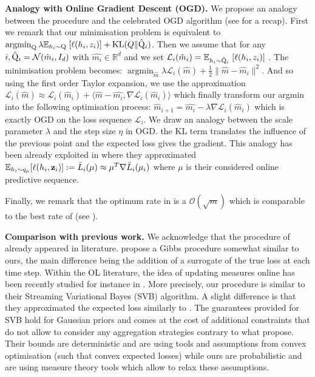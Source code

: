 \textbf{Analogy with Online Gradient Descent (OGD).} We propose an analogy between the procedure  and the celebrated OGD algorithm (see  for a recap). First we remark that our minimisation problem is equivalent to
$\operatorname{argmin}_{\mathrm{Q}} \lambda\mathbb{E}_{h_i\sim \mathrm{Q}} \; [\ell(h_i,z_i)] + \operatorname{KL}(Q\| \hat{\mathrm{Q}}_{i})$.
Then we assume that for any $i, \hat{\mathrm{Q}}_i=\mathcal{N}(\hat{m}_i,I_d)$ with $\hat{m_i}\in\mathbb{R}^d$  and we set $\mathcal{L}_i(\hat{m}_i)= \mathbb{E}_{h_i\sim \hat{\mathrm{Q}}_i} \; [\ell(h_i,z_i)] $ .
The minimisation problem becomes: $\operatorname{argmin}_{\hat{m}} \lambda\mathcal{L}_i(\hat{m}) + \frac{1}{2} \| \hat{m} - \hat{m}_i \|^2$.
And so using the first order Taylor expansion, we use the approximation $ \mathcal{L}_i(\hat{m}) \approx \mathcal{L}_i(\hat{m}_i ) + \langle \hat{m}- \hat{m_i}, \nabla \mathcal{L}_i(\hat{m}_i) \rangle $ which finally transform our argmin into the following optimisation process: $\hat{m}_{i+1} = \hat{m_i} - \lambda \nabla \mathcal{L}_i(\hat{m}_i)$ which is exactly OGD on the loss sequence $\mathcal{L}_i$.
We draw an analogy between the scale parameter $\lambda$ and the step size $\eta$ in OGD. the KL term translates the influence of the previous point and the expected loss gives the gradient.
This analogy has been already exploited in \citet{shalev2012online} where they approximated $\mathbb{E}_{h_i\sim q_\mu} [\ell(h_i,\mathbf{z}_i)]:= \bar{L}_i(\mu) \approx \mu^T\nabla \bar{L}_i(\mu_i)$ where $\mu$ is their considered online predictive sequence.

Finally, we remark that the optimum rate in  is a $\mathcal{O}(\sqrt{m})$ which is comparable to the best rate of \citet[][Eq (2.5)]{shalev2012online} (see ).



\textbf{Comparison with previous work.} We acknowledge that the procedure of  already appeared in literature. \citet[][Alg. 1]{li2018pac} propose a Gibbs procedure somewhat similar to ours, the main difference being the addition of a surrogate of the true loss at each time step.
Within the OL literature, the idea of updating measures online has been recently studied for instance in \citet{cherief2019generalization}. More precisely, our procedure is similar to their Streaming Variational Bayes (SVB) algorithm. A slight difference is that they approximated the expected loss similarly to \citet{shalev2012online}.
The guarantees \citet{cherief2019generalization} provided for SVB hold for Gaussian priors and comes at the cost of additional constraints that do not allow to consider any aggregation strategies contrary to what  propose. Their bounds are deterministic and are using tools and assumptions from convex optimisation (such that convex expected losses) while ours are probabilistic and are using measure theory tools which allow to relax these assumptions.

